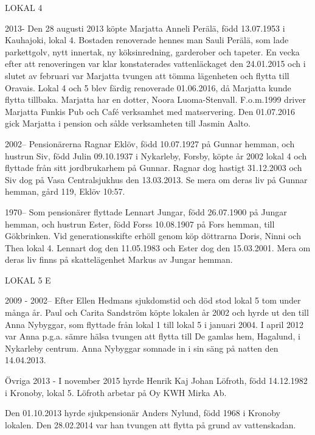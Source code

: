 LOKAL 4

 2013-
Den 28 augusti 2013 köpte Marjatta Anneli Perälä, född 13.07.1953 i Kauhajoki, lokal 4.	 Bostaden renoverade hennes man Sauli Perälä, som lade parkettgolv, nytt innertak, ny köksinredning, garderober och tapeter. En vecka efter att renoveringen var klar konstaterades vattenläckaget den 24.01.2015 och i slutet av februari var Marjatta tvungen att tömma lägenheten och flytta till Oravais. Lokal 4 och 5 blev färdig renoverade 01.06.2016, då Marjatta kunde flytta tillbaka. Marjatta har en dotter, Noora Luoma-Stenvall. F.o.m.1999 driver Marjatta Funkis Pub och Café verksamhet med matservering. Den 01.07.2016 gick Marjatta i pension och sålde verksamheten till Jasmin Aalto.

 2002--
Pensionärerna Ragnar Eklöv, född 10.07.1927 på Gunnar hemman, och hustrun Siv, född Julin 09.10.1937 i Nykarleby, Forsby, köpte år 2002 lokal 4 och flyttade från sitt jordbrukarhem på Gunnar. Ragnar dog hastigt 31.12.2003 och Siv dog på Vasa Centralsjukhus den 13.03.2013. Se mera om deras liv på Gunnar hemman, gård 119, Eklöv 10:57.

 1970--
Som pensionärer flyttade Lennart Jungar, född 26.07.1900 på Jungar hemman, och hustrun Ester, född Forss 10.08.1907 på Fors hemman, till Gökbrinken. Vid generationsskifte erhöll genom köp döttrarna Doris, Ninni och Thea lokal 4. Lennart dog den 11.05.1983 och Ester dog den 15.03.2001. Mera om deras liv finns på skattelägenhet Markus av Jungar hemman.


LOKAL 5 E

 2009 -
 2002--
Efter Ellen Hedmans sjukdomstid och död stod lokal 5 tom under många år. Paul och Carita Sandström köpte lokalen år 2002 och hyrde ut den till Anna Nybyggar, som flyttade från lokal 1 till lokal 5 i januari 2004.  I april 2012 var Anna p.g.a. sämre hälsa tvungen att flytta till De gamlas hem, Hagalund, i Nykarleby centrum. Anna Nybyggar somnade in i sin säng på natten den 14.04.2013.


Övriga  2013 -
I november 2015 hyrde Henrik Kaj Johan Löfroth, född 14.12.1982 i Kronoby, lokal 5. Löfroth arbetar på Oy KWH Mirka Ab.

Den 01.10.2013 hyrde sjukpensionär Anders Nylund, född 1968 i Kronoby lokalen. Den 28.02.2014 var han tvungen att flytta på grund av vattenskadan.

